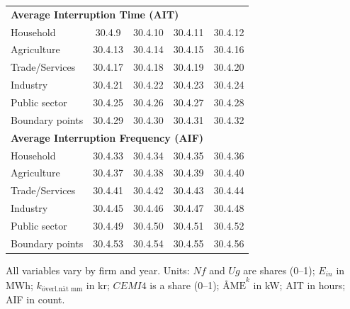 \begin{table}[H]
\begin{threeparttable}
\begin{tabular}{@{}p{8cm}cccc@{}}
\midrule
\multicolumn{5}{l}{\textbf{Average Interruption Time (AIT)}} \\
Household & 30.4.9 & 30.4.10 & 30.4.11 & 30.4.12 \\
Agriculture & 30.4.13 & 30.4.14 & 30.4.15 & 30.4.16 \\
Trade/Services & 30.4.17 & 30.4.18 & 30.4.19 & 30.4.20 \\
Industry & 30.4.21 & 30.4.22 & 30.4.23 & 30.4.24 \\
Public sector & 30.4.25 & 30.4.26 & 30.4.27 & 30.4.28 \\
Boundary points & 30.4.29 & 30.4.30 & 30.4.31 & 30.4.32 \\
\midrule
\multicolumn{5}{l}{\textbf{Average Interruption Frequency (AIF)}} \\
Household & 30.4.33 & 30.4.34 & 30.4.35 & 30.4.36 \\
Agriculture & 30.4.37 & 30.4.38 & 30.4.39 & 30.4.40 \\
Trade/Services & 30.4.41 & 30.4.42 & 30.4.43 & 30.4.44 \\
Industry & 30.4.45 & 30.4.46 & 30.4.47 & 30.4.48 \\
Public sector & 30.4.49 & 30.4.50 & 30.4.51 & 30.4.52 \\
Boundary points & 30.4.53 & 30.4.54 & 30.4.55 & 30.4.56 \\
\bottomrule
\end{tabular}
\begin{tablenotes}
\item All variables vary by firm and year. Units: $Nf$ and $Ug$ are shares (0--1); $E_{in}$ in MWh; $k_{\text{överl.nät mm}}$ in kr; $CEMI4$ is a share (0--1); $\text{ÅME}^k$ in kW; AIT in hours; AIF in count.
\end{tablenotes}
\end{threeparttable}
\end{table}


